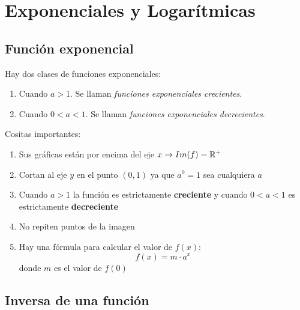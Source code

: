 \chapter*{Exponenciales y Logarítmicas}
\setcounter{chapter}{1}
\setcounter{section}{0}

\section{Función exponencial}

Hay dos clases de funciones exponenciales:
\begin{enumerate}
    \item Cuando $a > 1$. Se llaman \emph{funciones exponenciales crecientes}.
    \item Cuando $0 < a < 1$. Se llaman \emph{funciones exponenciales decrecientes}.
\end{enumerate}

Cositas importantes: 
\begin{enumerate}
    \item Sus gráficas están por encima del eje $x \rightarrow Im(f) = {\mathbb{R}}^+$
    \item Cortan al eje $y$ en el punto $(0, 1)$ ya que $a^0 = 1$ sea cualquiera $a$
    \item Cuando $a > 1$ la función es estrictamente \textbf{creciente} y cuando $0 < a < 1$ es estrictamente \textbf{decreciente}
    \item No repiten puntos de la imagen
    \item {Hay una fórmula para calcular el valor de $f(x)$:
        $$f(x) = m \cdot a^x$$
        donde $m$ es el valor de $f(0)$
    }
\end{enumerate}

\section{Inversa de una función}


